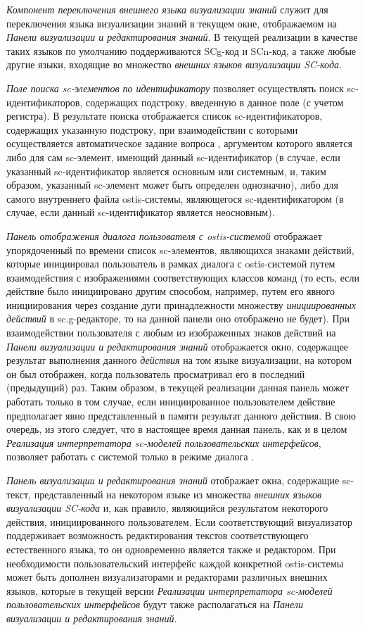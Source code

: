 \textit{Компонент переключения внешнего языка визуализации знаний} служит для переключения языка визуализации знаний в
текущем окне, отображаемом на \textit{Панели визуализации и редактирования знаний}. В текущей реализации в качестве
таких языков по умолчанию поддерживаются SCg-код и SCn-код, а также любые другие языки, входящие во множество
\textit{внешних языков визуализации SC-кода}.

\textit{Поле поиска sc-элементов по идентификатору} позволяет осуществлять поиск \mbox{sc-идентификаторов}, содержащих
подстроку, введенную в данное поле (с учетом регистра). В результате поиска отображается список sc-идентификаторов,
содержащих указанную подстроку, при взаимодействии с которыми осуществляется автоматическое задание вопроса
, аргументом которого является либо для сам sc-элемент, имеющий данный sc-идентификатор (в случае,
если указанный sc-идентификатор является основным или системным, и, таким образом, указанный sc-элемент может быть
определен однозначно), либо для самого внутреннего файла ostis-системы, являющегося sc-идентификатором (в случае, если
данный sc-идентификатор является неосновным).

\textit{Панель отображения диалога пользователя с ostis-системой} отображает упорядоченный по времени список sc-элементов,
являющихся знаками действий, которые инициировал пользователь в рамках диалога с ostis-системой путем взаимодействия
с изображениями соответствующих классов команд (то есть, если действие было инициировано другим способом, например,
путем его явного инициирования через создание дуги принадлежности множеству \textit{инициированных действий} в
sc.g-редакторе, то на данной панели оно отображено не будет). При взаимодействии пользователя с любым из изображенных
знаков действий на \textit{Панели визуализации и редактирования знаний} отображается окно, содержащее результат выполнения
данного \textit{действия} на том языке визуализации, на котором он был отображен, когда пользователь просматривал его в
последний (предыдущий) раз. Таким образом, в текущей реализации данная панель может работать только в том случае, если
инициированное пользователем действие предполагает явно представленный в памяти результат данного действия. В свою очередь,
из этого следует, что в настоящее время данная панель, как и в целом \textit{Реализация интерпретатора sc-моделей
пользовательских интерфейсов}, позволяет работать с системой только в режиме диалога .

\textit{Панель визуализации и редактирования знаний} отображает окна, содержащие sc-текст, представленный на
некотором языке из множества \textit{внешних языков визуализации SC-кода} и, как правило, являющийся результатом
некоторого действия, инициированного пользователем. Если соответствующий визуализатор поддерживает возможность
редактирования текстов соответствующего естественного языка, то он одновременно является также и редактором.
При необходимости пользовательский интерфейс каждой конкретной ostis-системы может быть дополнен визуализаторами и
редакторами различных внешних языков, которые в текущей версии \textit{Реализации интерпретатора sc-моделей
пользовательских интерфейсов} будут также располагаться на \textit{Панели визуализации и редактирования знаний}.

